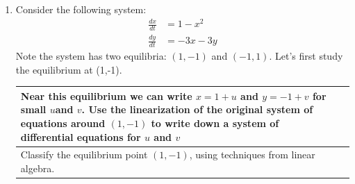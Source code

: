 \begin{enumerate}[resume]

\item Consider the following system: \label{15problem9}
\begin{align*}
\frac{dx}{dt} &= 1-x^2 \\
\frac{dy}{dt} &= -3x -3y
\end{align*}
Note the system has two equilibria: $(1,-1)$ and $(-1,1)$.   Let's first study the equilibrium at (1,-1). \label{15problem10}






\begin{tabular}{|p{2.5in}|p{3in}|}
\hline
Near this equilibrium we can write $x=1+u$ and $y=-1+v$ for small $u$and $v$. Use the linearization of the original system of equations around $(1,-1)$ to write down a system of differential equations for $u$ and $v$ \vspace{2in} &  \\ \hline
Classify the equilibrium point $(1,-1)$, using techniques from linear algebra. \vspace{2in} &  \\ \hline
\end{tabular}


\end{enumerate}
